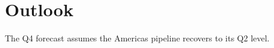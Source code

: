 \documentclass[11pt,a4paper]{article}
\begin{document}
%
%
%
%
%
%



%
%
%
%
%



\section{Outlook}
\label{sec:outlook}

The Q4 forecast assumes the Americas pipeline recovers
to its Q2 level.
\end{document}
